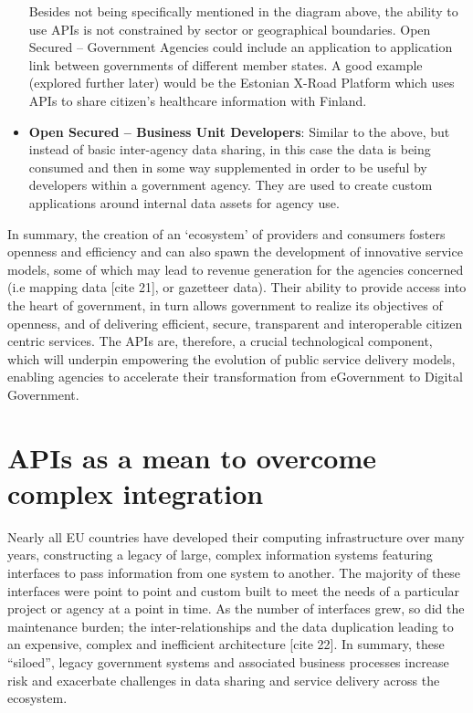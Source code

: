 \begin{itemize}
	 Besides not being specifically mentioned in the diagram above, the ability to use
	 APIs is not constrained by sector or geographical boundaries. Open Secured
	 – Government Agencies could include an application to application link
	 between governments of different member states. A good example (explored
	 further later) would be the Estonian X-Road Platform which uses APIs to
	 share citizen’s healthcare information with Finland.
	 
	 \item \textbf{Open Secured – Business Unit Developers}: Similar to the above, but
	 instead of basic inter-agency data sharing, in this case the data is being
	 consumed and then in some way supplemented in order to be useful by developers
	 within a government agency. They are used to create custom applications around
	 internal data assets for agency use.
\end{itemize}

In summary, the creation of an ‘ecosystem’ of providers and consumers fosters
openness and efficiency and can also spawn the development of innovative service
models, some of which may lead to revenue generation for the agencies concerned
(i.e mapping data [cite 21], or gazetteer data). Their ability to provide access
into the heart of government, in turn allows government to realize its objectives
of openness, and of delivering efficient, secure, transparent and interoperable
citizen centric services. The APIs are, therefore, a crucial technological
component, which will underpin empowering the evolution of public service delivery
models, enabling agencies to accelerate their transformation from eGovernment to
Digital Government.

\section{APIs as a mean to overcome complex integration}

Nearly all EU countries have developed their computing infrastructure over
many years, constructing a legacy of large, complex information systems featuring
interfaces to pass information from one system to another. The majority of these
interfaces were point to point and custom built to meet the needs of a particular
project or agency at a point in time. As the number of interfaces grew, so did the
maintenance burden; the inter-relationships and the data duplication leading to an
expensive, complex and inefficient architecture [cite 22]. In summary, these
“siloed”, legacy government systems and associated business processes increase
risk and exacerbate challenges in data sharing and service delivery across the
ecosystem.

